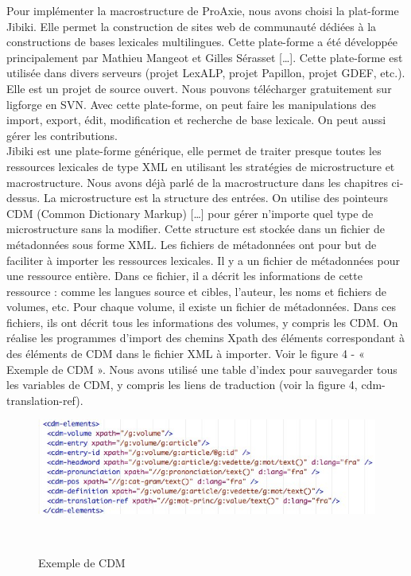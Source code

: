 \documentclass[10pt,a4paper,twoside]{article}
\begin{document}
\begin{itemize}
\cite{MMCE11}
Pour implémenter la macrostructure de ProAxie, nous avons choisi la plat-forme Jibiki. Elle permet la construction de sites web de communauté dédiées à la constructions de bases lexicales multilingues. Cette plate-forme a été développée principalement par Mathieu Mangeot et Gilles Sérasset […]. Cette plate-forme est utilisée dans divers serveurs (projet LexALP, projet Papillon, projet GDEF, etc.). Elle est un projet de source ouvert. Nous pouvons télécharger gratuitement sur ligforge en SVN. Avec cette plate-forme, on peut faire les manipulations des import, export, édit, modification et recherche de base lexicale. On peut aussi gérer les contributions. \\
Jibiki est une plate-forme générique, elle permet de traiter presque toutes les ressources lexicales de type XML en utilisant les stratégies de microstructure et macrostructure. Nous avons déjà parlé de la macrostructure dans les chapitres ci-dessus. La microstructure est la structure des entrées. On utilise des pointeurs CDM (Common Dictionary Markup) […] pour gérer n’importe quel type de microstructure sans la modifier. Cette structure est stockée dans un fichier de métadonnées sous forme XML. Les fichiers de métadonnées ont pour but de faciliter à importer les ressources lexicales.  Il y a un fichier de métadonnées pour une ressource entière.  Dans ce fichier, il a décrit les informations de cette ressource : comme les langues source et cibles, l’auteur, les noms et fichiers de volumes, etc. Pour chaque volume, il existe un fichier de métadonnées. Dans ces fichiers, ils ont décrit tous les informations des volumes, y compris les CDM. On réalise les programmes d’import des chemins Xpath des éléments correspondant à des éléments de CDM dans le fichier XML à importer. Voir le figure 4 - « Exemple de CDM ». Nous avons utilisé une table d’index pour sauvegarder tous les variables de CDM, y compris les liens de traduction (voir la figure 4, cdm-translation-ref). \\
\begin{figure}[htbp] 
\begin{center} 
\includegraphics[width=14cm]{images/CDM.jpg}
\end{center} 
\caption{Exemple de CDM} \label{image} \
\end{figure}


\end{itemize}
\end{document}
